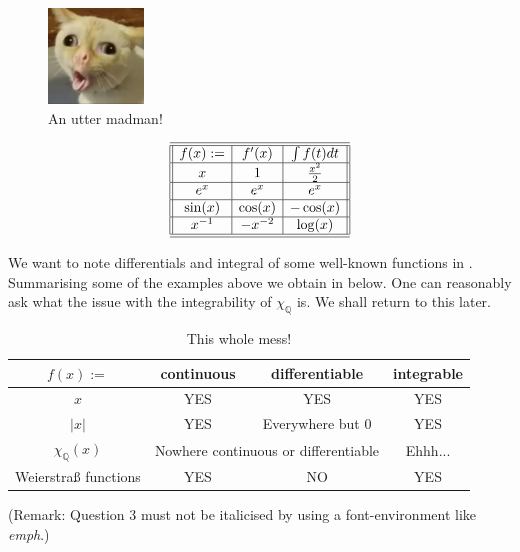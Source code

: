 \documentclass{article}
\theoremstyle{qqStyle}
\newcommand{\Q}{\mathbb{Q}}
\newcommand{\Y}{YES}
\begin{document}
\begin{figure}[!h]
\begin{center}
\includegraphics[scale=4]{./kotecek.png}
\caption{An utter madman!}\label{fig1}
\end{center}
\end{figure}

\begin{equation}
\begin{array}{|| c | c | c ||}
\hline \hline
f(x):= & f'(x) & \int f(t)dt\\
\hline

x & 1 & \frac{x^2}{2}\\
\hline
e^x & e^x & e^x\\
\hline
\sin(x) & \cos(x) & -\cos(x)\\
\hline
x^{-1} & -x^{-2} & \log(x)\\
\hline \hline
\end{array}\label{tab1}
\end{equation}
\medskip

We want to note differentials and integral of some well-known functions in . Summarising some of the examples above we obtain in  below. One can reasonably ask what the issue with the integrability of $\chi_\Q$ is. We shall return to this later.

\begin{table}[h]
\centering
\begin{tabular}{|c||c|c|c|}
\hline
$f(x):=$ & continuous & differentiable & integrable\\
\hline \hline
$x$ & \Y&\Y&\Y\\
\hline
$|x|$&\Y&Everywhere but $0$&\Y\\
\hline
$\chi_\Q(x)$&\multicolumn{2}{|c|}{Nowhere continuous or differentiable}&Ehhh...\\
\hline

Weierstraß functions&\Y&NO&\Y\\
\hline
\end{tabular}

\caption{This whole mess!}\label{tab2}
\end{table}

(Remark: Question 3 must not be italicised by using a font-environment like \emph{emph}.)
\end{document}
